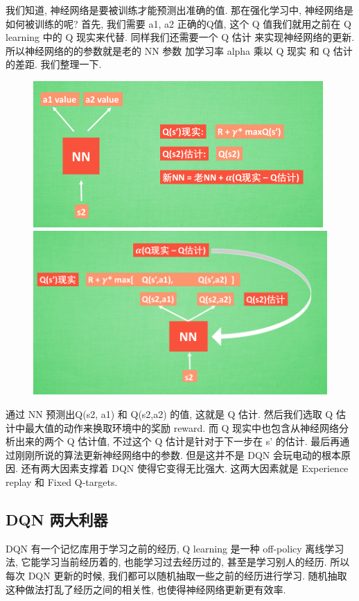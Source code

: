 \documentclass[UTF8,a4paper,12pt]{ctexbook}
\begin{document}
			我们知道, 神经网络是要被训练才能预测出准确的值. 那在强化学习中, 神经网络是如何被训练的呢? 首先, 我们需要 a1, a2 正确的Q值, 这个 Q 值我们就用之前在 Q learning 中的 Q 现实来代替. 同样我们还需要一个 Q 估计 来实现神经网络的更新. 所以神经网络的的参数就是老的 NN 参数 加学习率 alpha 乘以 Q 现实 和 Q 估计 的差距. 我们整理一下.
			\begin{figure}[H]
				\centering
				\includegraphics[width=.9\linewidth]{DQN3}
				\includegraphics[width=.9\linewidth]{DQN4}
			\end{figure}			
			通过 NN 预测出Q(s2, a1) 和 Q(s2,a2) 的值, 这就是 Q 估计. 然后我们选取 Q 估计中最大值的动作来换取环境中的奖励 reward. 而 Q 现实中也包含从神经网络分析出来的两个 Q 估计值, 不过这个 Q 估计是针对于下一步在 s’ 的估计. 最后再通过刚刚所说的算法更新神经网络中的参数. 但是这并不是 DQN 会玩电动的根本原因. 还有两大因素支撑着 DQN 使得它变得无比强大. 这两大因素就是 Experience replay 和 Fixed Q-targets.
		
		\subsection{DQN 两大利器}
			DQN 有一个记忆库用于学习之前的经历, Q learning 是一种 off-policy 离线学习法, 它能学习当前经历着的, 也能学习过去经历过的, 甚至是学习别人的经历. 所以每次 DQN 更新的时候, 我们都可以随机抽取一些之前的经历进行学习. 随机抽取这种做法打乱了经历之间的相关性, 也使得神经网络更新更有效率. 
			
\end{document}
